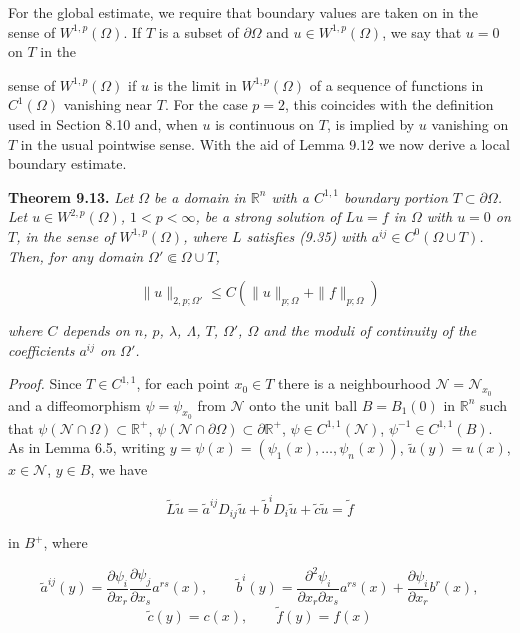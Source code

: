 \noindent For the global estimate, we require that boundary values are taken on in the sense of $W^{1,p}(\Omega)$. If $T$ is a subset of $\partial\Omega$ and $u \in W^{1,p}(\Omega)$, we say that $u = 0$ on $T$ in the



sense of $W^{1,p}(\Omega)$ if $u$ is the limit in $W^{1,p}(\Omega)$ of a sequence of functions in $C^1(\Omega)$ vanishing near $T$. For the case $p=2$, this coincides with the definition used in Section 8.10 and, when $u$ is continuous on $T$, is implied by $u$ vanishing on $T$ in the usual pointwise sense. With the aid of Lemma 9.12 we now derive a local boundary estimate.

\textbf{Theorem 9.13.} \textit{Let $\Omega$ be a domain in $\mathbb{R}^n$ with a $C^{1,1}$ boundary portion $T \subset \partial \Omega$. Let $u \in W^{2,p}(\Omega)$, $1<p<\infty$, be a strong solution of $Lu=f$ in $\Omega$ with $u=0$ on $T$, in the sense of $W^{1,p}(\Omega)$, where $L$ satisfies (9.35) with $a^{ij} \in C^0(\Omega \cup T)$. Then, for any domain $\Omega' \Subset \Omega \cup T$,}

\begin{equation}
\tag{9.42}
\|u\|_{2,p;\Omega'} \le C(\|u\|_{p;\Omega} + \|f\|_{p;\Omega})
\end{equation}

\textit{where $C$ depends on $n$, $p$, $\lambda$, $\Lambda$, $T$, $\Omega'$, $\Omega$ and the moduli of continuity of the coefficients $a^{ij}$ on $\Omega'$.}

\textit{Proof.} Since $T \in C^{1,1}$, for each point $x_0 \in T$ there is a neighbourhood $\mathcal{N}=\mathcal{N}_{x_0}$ and a diffeomorphism $\psi=\psi_{x_0}$ from $\mathcal{N}$ onto the unit ball $B=B_1(0)$ in $\mathbb{R}^n$ such that $\psi(\mathcal{N}\cap\Omega) \subset \mathbb{R}^+$, $\psi(\mathcal{N}\cap\partial\Omega) \subset \partial\mathbb{R}^+$, $\psi \in C^{1,1}(\mathcal{N})$, $\psi^{-1} \in C^{1,1}(B)$. As in Lemma 6.5, writing $y=\psi(x)=(\psi_1(x),\ldots,\psi_n(x))$, $\tilde{u}(y)=u(x)$, $x\in \mathcal{N}$, $y\in B$, we have

\[
\tilde{L}\tilde{u}=\tilde{a}^{ij}D_{ij}\tilde{u}+\tilde{b}^iD_i\tilde{u}+\tilde{c}\tilde{u}=\tilde{f}
\]

in $B^+$, where

\[
\tilde{a}^{ij}(y)=\frac{\partial\psi_i}{\partial x_r}\frac{\partial\psi_j}{\partial x_s}a^{rs}(x),\qquad
\tilde{b}^i(y)=\frac{\partial^2\psi_i}{\partial x_r\partial x_s}a^{rs}(x)+\frac{\partial\psi_i}{\partial x_r}b^r(x),
\]
\[
\tilde{c}(y)=c(x),\qquad \tilde{f}(y)=f(x)
\]

